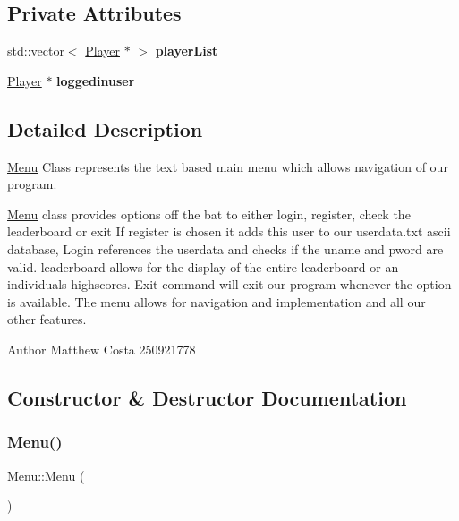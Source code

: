 \subsection*{Private Attributes}
\begin{DoxyCompactItemize}
\item 
\mbox{\label{classMenu_acf5fcd8a7996710086267c856991b053}} 
std\+::vector$<$ \hyperlink{classPlayer}{Player} $\ast$ $>$ {\bfseries player\+List}
\item 
\mbox{\label{classMenu_a9fec21a0fe02ffaf00ff13261a986eb1}} 
\hyperlink{classPlayer}{Player} $\ast$ {\bfseries loggedinuser}
\end{DoxyCompactItemize}


\subsection{Detailed Description}
\hyperlink{classMenu}{Menu} Class represents the text based main menu which allows navigation of our program. 

\hyperlink{classMenu}{Menu} class provides options off the bat to either login, register, check the leaderboard or exit If register is chosen it adds this user to our userdata.\+txt ascii database, Login references the userdata and checks if the uname and pword are valid. leaderboard allows for the display of the entire leaderboard or an individuals highscores. Exit command will exit our program whenever the option is available. The menu allows for navigation and implementation and all our other features. \begin{DoxyAuthor}{Author}
Matthew Costa 250921778 
\end{DoxyAuthor}


\subsection{Constructor \& Destructor Documentation}
\mbox{\label{classMenu_ad466dd83355124a6ed958430450bfe94}} 
\subsubsection{\texorpdfstring{Menu()}{Menu()}}
{\footnotesize\ttfamily Menu\+::\+Menu (\begin{DoxyParamCaption}{ }\end{DoxyParamCaption})}



